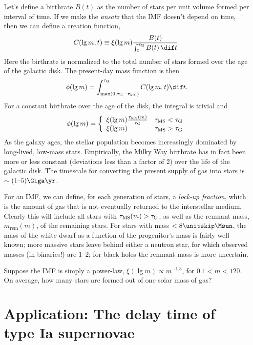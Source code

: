 Let's define a birthrate $B(t)$ as the number of stars per unit volume formed per interval of time.  If we make the \emph{ansatz} that the IMF doesn't depend on time, then we can define a creation function,
\begin{equation}\label{e.creation-fcn}
C(\lg m,t) \equiv \xi(\lg m)\frac{B(t)}{\int_{0}^{\tauG} B(t)\,\dif t}.
\end{equation}
Here the birthrate is normalized to the total number of stars formed over the age of the galactic disk. The present-day mass function is then
\[
	\phi(\lg m) = \int_{\max(0,\tauG-\tms)}^{\tauG} C(\lg m,t) \dif t.
\]
For a constant birthrate over the age of the disk, the integral is trivial and
\[
	\phi(\lg m) = \left\{\begin{array}{lr}\xi(\lg m)\frac{\tau_{\mathrm{MS}}(m)}{\tau_{\mathrm{G}}} & \tau_{\mathrm{MS}} < \tau_{\mathrm{G}} \\
		\xi(\lg m) & \tau_{\mathrm{MS}} > \tau_{\mathrm{G}}\end{array}\right.
\]
As the galaxy ages, the stellar population becomes increasingly dominated by long-lived, low-mass stars.
Empirically, the Milky Way birthrate has in fact been more or less constant (deviations less than a factor of 2) over the life of the galactic disk.  The timescale for converting the present supply of gas into stars is $\sim (1\textrm{--}5)\Giga\yr$.

For an IMF, we can define, for each generation of stars, a \emph{lock-up fraction}, which is the amount of gas that is not eventually returned to the interstellar medium. Clearly this will include all stars with $\tau_{\mathrm{MS}}(m) > \tau_{\mathrm{G}}$, as well as the remnant mass, $m_{\mathrm{rem}}(m)$, of the remaining stars.  For stars with mass $< 8\nsp\Msun$, the mass of the white dwarf as a function of the progenitor's mass is fairly well known; more massive stars leave behind either a neutron star, for which observed masses (in binaries!) are 1--2\nsp\Msun; for black holes the remnant mass is more uncertain.

\begin{exercisebox}
Suppose the IMF is simply a power-law, $\xi(\lg m) \propto m^{-1.3}$, for $0.1 < m < 120$. On average, how many stars are formed out of one solar mass of gas?
\end{exercisebox}

\section{Application: The delay time of type Ia supernovae}\label{s.delay-time}

